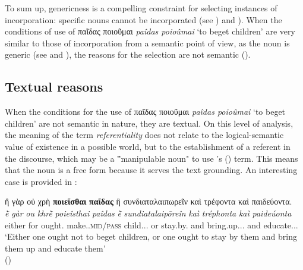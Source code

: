 \documentclass[output=paper,colorlinks,citecolor=brown]{langscibook}
\begin{document}
To sum up, genericness is a compelling constraint for selecting instances of incorporation: specific nouns cannot be incorporated (see ) and ). When the conditions of use of παῖδας ποιοῦμαι \textit{paîdas poioûmai} `to beget children' are very similar to those of incorporation from a semantic point of view, as the noun is generic (see  and ), the reasons for the selection are not semantic ().

\subsection{Textual reasons}\label{Section2/3}

When the conditions for the use of παῖδας ποιοῦμαι \textit{paîdas poioûmai} `to beget children' are not semantic in nature, they are textual. On this level of analysis, the meaning of the term \textit{referentiality} does not relate to the logical-semantic value of existence in a possible world, but to the establishment of a referent in the discourse, which may be a ‟manipulable noun" to use \citeauthor{HopperThompson1984}'s (\citeyear[711--713]{HopperThompson1984}) term. This means that the noun is a free form because it serves the text grounding. An interesting case is provided in : 

\ea \label{ex:9}
\glll ἢ 	γὰρ 	οὐ 	χρὴ		\textbf{ποιεῖσθαι} 		\textbf{παῖδας} ἢ 	συνδιαταλαιπωρεῖν 	καὶ 	τρέφοντα 		καὶ 	παιδεύοντα.\\
\textit{ḕ}	\textit{gàr}	\textit{ou}	\textit{khrḕ}		\textit{poieîsthai}		\textit{paîdas} \textit{ḕ}	\textit{sundiatalaipōreîn}	\textit{kaì}	\textit{tréphonta}		\textit{kaì}	\textit{paideúonta}\\
either for \Neg{} ought.\Tsg{} make.\Inf{}.\textsc{mid/pass} child.\Acc{}.\M{}.\Pl{} or stay.by.\Inf{} and bring.up.\Ptcp{}.\Acc{}.\M{} and educate.\Ptcp{}.\Acc{}.\M{}\\
\glt `Either one ought not to beget children, or one ought to stay by them and bring them up and educate them' \\
\hspace*{\fill}()
\z
\end{document}
